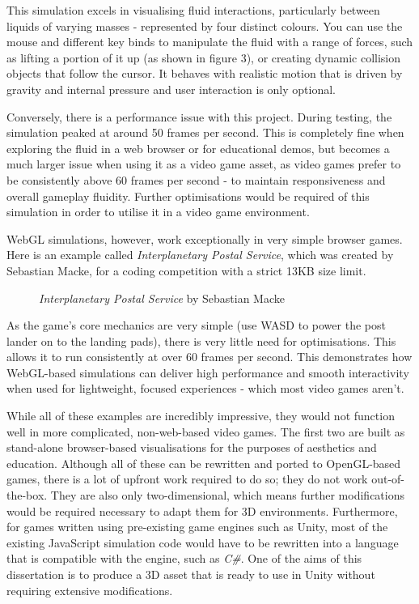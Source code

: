 \documentclass[a4paper, 12pt]{article}
\newcommand{\wideimage}[2][]{%
  \makebox[\textwidth][c]{\texttt{[image: \#2]}}%
}
\begin{document}
    This simulation excels in visualising fluid interactions, particularly between liquids of varying masses - represented by four distinct colours. You can use the mouse and different key binds to manipulate the fluid with a range of forces, such as lifting a portion of it up (as shown in figure 3), or creating dynamic collision objects that follow the cursor. It behaves with realistic motion that is driven by gravity and internal pressure and user interaction is only optional.

    Conversely, there is a performance issue with this project. During testing, the simulation peaked at around 50 frames per second. This is completely fine when exploring the fluid in a web browser or for educational demos, but becomes a much larger issue when using it as a video game asset, as video games prefer to be consistently above 60 frames per second - to maintain responsiveness and overall gameplay fluidity. Further optimisations would be required of this simulation in order to utilise it in a video game environment.

    WebGL simulations, however, work exceptionally in very simple browser games. Here is an example called \textit{Interplanetary Postal Service}\cite{ips}, which was created by Sebastian Macke, for a coding competition with a strict 13KB size limit.

    \begin{figure}[H]
        \wideimage[]{webGLIPS.png}
        \caption{\textit{Interplanetary Postal Service} by Sebastian Macke \cite{ips}}
    \end{figure}

    As the game's core mechanics are very simple (use WASD to power the post lander on to the landing pads), there is very little need for optimisations. This allows it to run consistently at over 60 frames per second. This demonstrates how WebGL-based simulations can deliver high performance and smooth interactivity when used for lightweight, focused experiences - which most video games aren't.

    While all of these examples are incredibly impressive, they would not function well in more complicated, non-web-based video games. The first two are built as stand-alone browser-based visualisations for the purposes of aesthetics and education. Although all of these can be rewritten and ported to OpenGL-based games, there is a lot of upfront work required to do so; they do not work out-of-the-box. They are also only two-dimensional, which means further modifications would be required necessary to adapt them for 3D environments. Furthermore, for games written using pre-existing game engines such as Unity, most of the existing JavaScript simulation code would have to be rewritten into a language that is compatible with the engine, such as \textit{C\#}. One of the aims of this dissertation is to produce a 3D asset that is ready to use in Unity without requiring extensive modifications.
\end{document}
